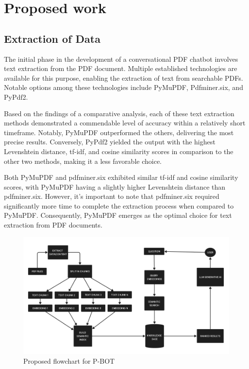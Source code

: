\documentclass[conference]{IEEEtran}
\begin{document}
\section{Proposed work}

\subsection{Extraction of Data}

The initial phase in the development of a conversational PDF chatbot involves text extraction from the PDF document. Multiple established technologies are available for this purpose, enabling the extraction of text from searchable PDFs. Notable options among these technologies include PyMuPDF, Pdfminer.six, and PyPdf2.

Based on the findings of a comparative analysis, each of these text extraction methods demonstrated a commendable level of accuracy within a relatively short timeframe. Notably, PyMuPDF outperformed the others, delivering the most precise results. Conversely, PyPdf2 yielded the output with the highest Levenshtein distance, tf-idf, and cosine similarity scores in comparison to the other two methods, making it a less favorable choice.

Both PyMuPDF and pdfminer.six exhibited similar tf-idf and cosine similarity scores, with PyMuPDF having a slightly higher Levenshtein distance than pdfminer.six. However, it's important to note that pdfminer.six required significantly more time to complete the extraction process when compared to PyMuPDF. Consequently, PyMuPDF emerges as the optimal choice for text extraction from PDF documents.

\begin{figure}
    \centering
    \includegraphics[width=\textwidth]{FLOWC}
    \caption{Proposed flowchart for P-BOT}
    \label{fig:your_image_label}
\end{figure}
\end{document}
